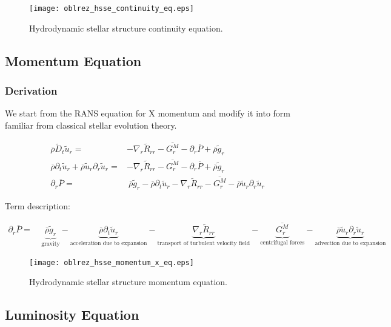 \documentclass[10pt,paper=a4]{report}
\newcommand{\eht}{\overline}
\newcommand{\fht}{\widetilde}
\begin{document}
\begin{figure}[!h]
\centerline{
  \texttt{[image: oblrez\_hsse\_continuity\_eq.eps]}}
\caption{Hydrodynamic stellar structure continuity equation.}
\end{figure}

\newpage

\subsection{Momentum Equation}

\subsubsection{Derivation}

We start from the RANS equation for X momentum and modify it into form familiar from classical stellar evolution theory.

\begin{align}
\eht{\rho} \fht{D}_t \fht{u}_r = & -\nabla_r \fht{R}_{rr} - \eht{G_r^M} - \partial_r \eht{P} + \eht{\rho}\fht{g}_r \\
\eht{\rho} \partial_t \fht{u}_r + \eht{\rho} \fht{u}_r \partial_r \fht{u}_r  = & -\nabla_r \fht{R}_{rr} - \eht{G_r^M} - \partial_r \eht{P} + \eht{\rho}\fht{g}_r \\
\partial_r \eht{P} = & \ \eht{\rho}\fht{g}_r - \eht{\rho} \partial_t \fht{u}_r - \nabla_r \fht{R}_{rr} - \eht{G_r^M} - \eht{\rho} \fht{u}_r \partial_r \fht{u}_r
\end{align}  

\newpage

\noindent
Term description:

\begin{align}
\partial_r \eht{P} = & \ \underbrace{\eht{\rho}\fht{g}_r}_\text{gravity} - \underbrace{\eht{\rho} \partial_t \fht{u}_r}_\text{acceleration due to expansion} - \underbrace{\nabla_r \fht{R}_{rr}}_\text{transport of turbulent velocity field} - \underbrace{\eht{G_r^M}}_\text{centrifugal forces} - \underbrace{\eht{\rho} \fht{u}_r \partial_r \fht{u}_r}_\text{advection due to expansion}
\end{align}  

\begin{figure}[!h]
\centerline{
  \texttt{[image: oblrez\_hsse\_momentum\_x\_eq.eps]}}
\caption{Hydrodynamic stellar structure momentum equation.}
\end{figure}

\subsection{Luminosity Equation}
\end{document}
